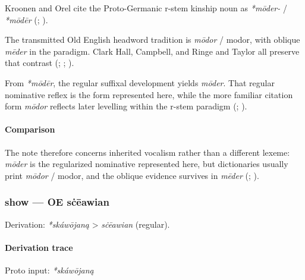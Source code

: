 \documentclass[
  british,
  a4paper,
]{article}
\begin{document}
Kroonen and Orel cite the Proto-Germanic r-stem kinship noun as
\emph{*mōder-} / \emph{*mōdēr} (; ).

The transmitted Old English headword tradition is \emph{mōdor} / modor,
with oblique \emph{mēder} in the paradigm. Clark Hall, Campbell, and
Ringe and Taylor all preserve that contrast
(;
;
).

From \emph{*mōdēr}, the regular suffixal development yields
\emph{mōder}. That regular nominative reflex is the form represented
here, while the more familiar citation form \emph{mōdor} reflects later
levelling within the r-stem paradigm
(;
).

\paragraph{Comparison}\label{comparison-2}

The note therefore concerns inherited vocalism rather than a different
lexeme: \emph{mōder} is the regularized nominative represented here, but
dictionaries usually print \emph{mōdor} / modor, and the oblique
evidence survives in \emph{mēder} (; ).

\subsubsection{show --- OE sċēawian}\label{show-oe-sux10bux113awian-1}

Derivation: \emph{*skáwōjaną} \textgreater{} \emph{sċēawian} (regular).

\paragraph{Derivation trace}\label{derivation-trace-22}

Proto input: \emph{*skáwōjaną}

\begingroup
\setlength{\fboxsep}{6pt}
\end{document}
